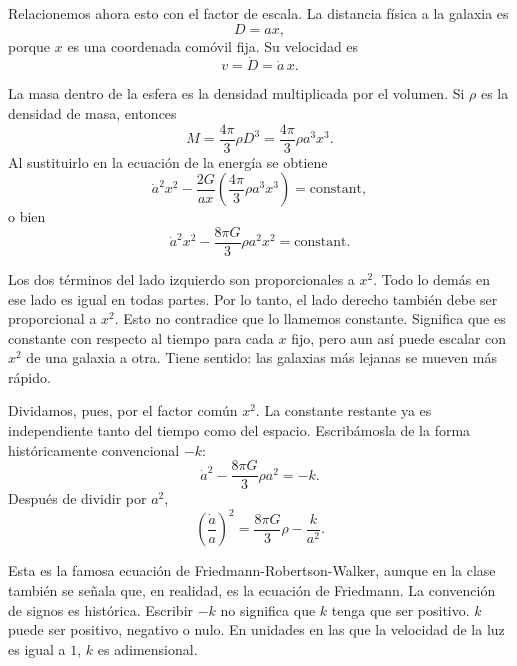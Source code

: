 Relacionemos ahora esto con el factor de escala. La distancia física a la galaxia es
\begin{equation}
D=ax,
\end{equation}
porque \(x\) es una coordenada comóvil fija. Su velocidad es
\begin{equation}
v=\dot D=\dot a\,x.
\end{equation}

La masa dentro de la esfera es la densidad multiplicada por el volumen. Si \(\rho\) es la densidad de masa, entonces
\begin{equation}
M=\frac{4\pi}{3}\rho D^3=\frac{4\pi}{3}\rho a^3x^3.
\end{equation}
Al sustituirlo en la ecuación de la energía se obtiene
\begin{equation}
\dot a^2x^2-\frac{2G}{ax}\left(\frac{4\pi}{3}\rho a^3x^3\right)=\text{constant},
\end{equation}
o bien
\begin{equation}
\dot a^2x^2-\frac{8\pi G}{3}\rho a^2x^2=\text{constant}.
\end{equation}

Los dos términos del lado izquierdo son proporcionales a \(x^2\). Todo lo demás en ese lado es igual en todas partes. Por lo tanto, el lado derecho también debe ser proporcional a \(x^2\). Esto no contradice que lo llamemos constante. Significa que es constante con respecto al tiempo para cada \(x\) fijo, pero aun así puede escalar con \(x^2\) de una galaxia a otra. Tiene sentido: las galaxias más lejanas se mueven más rápido.

Dividamos, pues, por el factor común \(x^2\). La constante restante ya es independiente tanto del tiempo como del espacio. Escribámosla de la forma históricamente convencional \(-k\):
\begin{equation}
\dot a^2-\frac{8\pi G}{3}\rho a^2=-k.
\end{equation}
Después de dividir por \(a^2\),
\begin{equation}
\left(\frac{\dot a}{a}\right)^2=\frac{8\pi G}{3}\rho-\frac{k}{a^2}.
\end{equation}

Esta es la famosa ecuación de Friedmann-Robertson-Walker, aunque en la clase también se señala que, en realidad, es la ecuación de Friedmann. La convención de signos es histórica. Escribir \(-k\) no significa que \(k\) tenga que ser positivo. \(k\) puede ser positivo, negativo o nulo. En unidades en las que la velocidad de la luz es igual a \(1\), \(k\) es adimensional.

